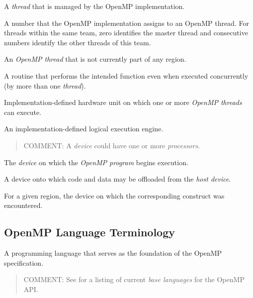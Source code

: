 \glossarydefstart
A \emph{thread} that is managed by the OpenMP implementation.
\glossarydefend


\glossarydefstart
A number that the OpenMP implementation assigns to an OpenMP thread. 
For threads within the same team, zero identifies the master 
thread and consecutive numbers identify the other threads of 
this team.
\glossarydefend

\glossarydefstart
An \emph{OpenMP thread} that is not currently part of any 
 region.
\glossarydefend

\glossarydefstart
A routine that performs the intended function even when executed concurrently
(by more than one \emph{thread}).
\glossarydefend

\glossarydefstart
Implementation-defined hardware unit on which one or more 
\emph{OpenMP threads} can execute.
\glossarydefend

\glossarydefstart
An implementation-defined logical execution engine.

\begin{quote}
COMMENT: A \emph{device} could have one or more \emph{processors}.
\end{quote}
\glossarydefend

\glossarydefstart
The \emph{device} on which the \emph{OpenMP program} begins execution.
\glossarydefend

\glossarydefstart
A device onto which code and data may be offloaded from the \emph{host device}.
\glossarydefend

\glossarydefstart
For a given  region, the device on which the corresponding 
 construct was encountered.
\glossarydefend

% 
\subsection{OpenMP Language Terminology}
\label{subsec:OpenMP Language Terminology}
\glossarydefstart
A programming language that serves as the foundation of the OpenMP
specification.

\begin{quote}
COMMENT: See 
for a listing of current \emph{base languages} for the OpenMP API.
\end{quote}
\glossarydefend

